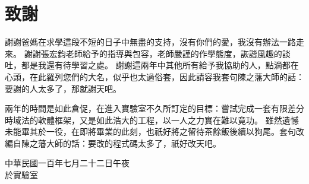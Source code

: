 \cleardoublepage
\chapter{\kai 致謝}
{\kai
謝謝爸媽在求學這段不短的日子中無盡的支持，沒有你們的愛，我沒有辦法一路走來。
謝謝張宏鈞老師給予的指導與包容，老師嚴謹的作學態度，詼諧風趣的談吐，都是我還有待學習之處。
謝謝這兩年中其他所有給予我協助的人，點滴都在心頭，在此羅列您們的大名，似乎也太過俗套，因此請容我套句陳之藩大師的話：要謝的人太多了，那就謝天吧。\blacksmiley

兩年的時間是如此倉促，在進入實驗室不久所訂定的目標：嘗試完成一套有限差分時域法的軟體框架，又是如此浩大的工程，以一人之力實在難以竟功。
雖然遺憾未能畢其於一役，在即將畢業的此刻，也祇好將之留待茶餘飯後續以狗尾。套句改編自陳之藩大師的話：要改的程式碼太多了，祇好改天吧。\smiley

\begin{flushright}
中華民國一百年七月二十二日午夜\\於實驗室
\end{flushright}
}
